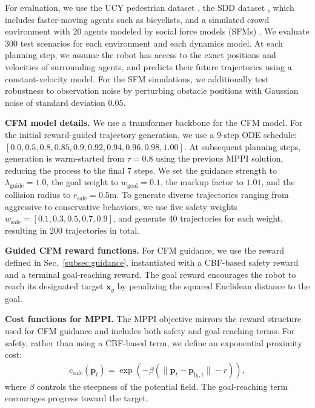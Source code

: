 \documentclass[letterpaper,10 pt,conference]{ieeeconf}
\begin{document}
For evaluation, we use the UCY pedestrian dataset \cite{LernerChrysanthouEtAl2007}, the SDD dataset \cite{RobicquetSadeghianEtAl2016}, which includes faster-moving agents such as bicyclists, and a simulated crowd environment with 20 agents modeled by social force models (SFMs) \cite{HelbingMolnar1995}. 
We evaluate 300 test scenarios for each environment and each dynamics model. 
At each planning step, we assume the robot has access to the exact positions and velocities of surrounding agents, and predicts their future trajectories using a constant-velocity model. 
For the SFM simulations, we additionally test robustness to observation noise by perturbing obstacle positions with Gaussian noise of standard deviation $0.05$.


\noindent\textbf{CFM model details.} 
We use a transformer backbone \cite{VaswaniShazeerEtAl2017} for the CFM model.
For the initial reward-guided trajectory generation, we use a 9-step ODE schedule: $[0.0, 0.5, 0.8, 0.85, 0.9, 0.92, 0.94, 0.96, 0.98, 1.00]$.
At subsequent planning steps, generation is warm-started from $\tau=0.8$ using the previous MPPI solution, reducing the process to the final 7 steps.
We set the guidance strength to $\lambda_\text{guide}=1.0$, the goal weight to $w_\mathrm{goal}=0.1$, the markup factor to $1.01$, and the collision radius to $r_\mathrm{safe}=0.5$m.
To generate diverse trajectories ranging from aggressive to conservative behaviors, we use five safety weights $w_\mathrm{safe}=[0.1, 0.3, 0.5, 0.7, 0.9]$, and generate 40 trajectories for each weight, resulting in 200 trajectories in total.

\noindent\textbf{Guided CFM reward functions.} 
For CFM guidance, we use the reward defined in Sec.~\ref{subsec:guidance}, instantiated with a CBF-based safety reward and a terminal goal-reaching reward. 
The goal reward encourages the robot to reach its designated target $\mathbf{x}_g$ by penalizing the squared Euclidean distance to the goal.

\noindent\textbf{Cost functions for MPPI.} 
The MPPI objective mirrors the reward structure used for CFM guidance and includes both safety and goal-reaching terms. 
For safety, rather than using a CBF-based term, we define an exponential proximity cost:
\begin{align}
    c_\text{safe}(\mathbf{p}_t) = \exp(-\beta( \|\mathbf{p}_t - \mathbf{p}_\mathrm{h_i,t}\| - r)),
\end{align}
where $\beta$ controls the steepness of the potential field. The goal-reaching term encourages progress toward the target.
\end{document}
